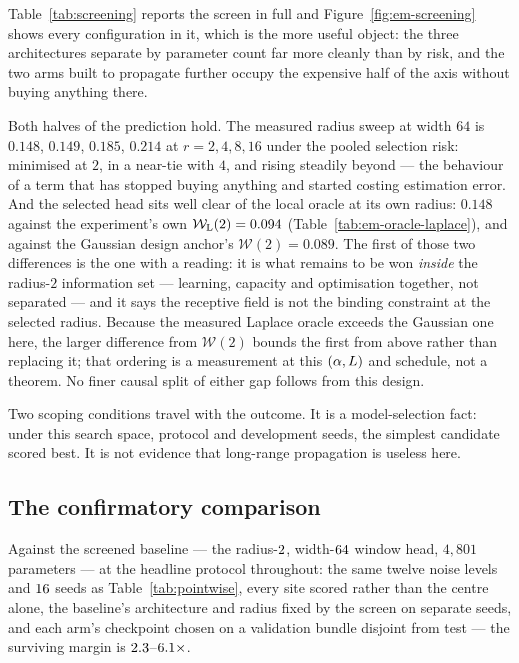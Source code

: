 Table~\ref{tab:screening} reports the screen in full and
Figure~\ref{fig:em-screening} shows every configuration in it, which is the more
useful object: the three architectures separate by parameter count far more
cleanly than by risk, and the two arms built to propagate further occupy the
expensive half of the axis without buying anything there.

Both halves of the prediction hold. The measured radius sweep at width $64$
is $\mathbf{0.148}$, $0.149$, $0.185$, $0.214$ at $r = 2, 4, 8, 16$ under the
pooled selection risk: minimised at $2$, in a near-tie with $4$, and rising
steadily beyond --- the behaviour of a term that has stopped
buying anything and started costing estimation error. And the selected head
sits well clear of the local oracle at its own radius: $0.148$ against the
experiment's own $\mathcal{W}_{\mathrm{L}}(2) = 0.094$
(Table~\ref{tab:em-oracle-laplace}), and against the Gaussian design
anchor's $\mathcal{W}(2) = 0.089$. The first of those two differences is the
one with a reading: it is what remains to be won \emph{inside} the radius-$2$
information set --- learning, capacity and optimisation together, not
separated --- and it says the receptive field is not the binding constraint
at the selected radius. Because the measured Laplace oracle exceeds the
Gaussian one here, the larger difference from $\mathcal{W}(2)$ bounds the
first from above rather than replacing it; that ordering is a measurement at
this $(\alpha, L)$ and schedule, not a theorem. No finer causal split of
either gap follows from this design.

Two scoping conditions travel with the outcome. It is a model-selection fact:
under this search space, protocol and development seeds, the simplest candidate
scored best. It is not evidence that long-range propagation is useless here.

\subsection{The confirmatory comparison}

Against the screened baseline --- the radius-$2$,
width-$64$ window head, $4{,}801$ parameters --- at the
headline protocol throughout: the same
twelve noise levels and $16$ seeds as
Table~\ref{tab:pointwise}, every site scored rather than the centre alone, the
baseline's architecture and radius fixed by the screen on separate seeds, and
each arm's checkpoint chosen on a validation bundle disjoint from test --- the
surviving margin is $2.3$--$6.1\times$.

